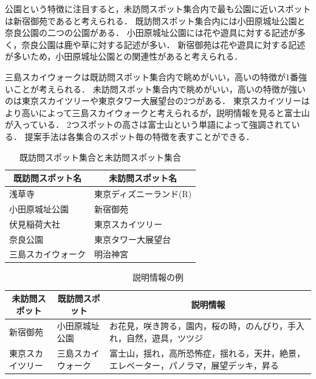 \documentclass{deimj}
\begin{document}
公園という特徴に注目すると，未訪問スポット集合内で最も公園に近いスポットは新宿御苑であると考えられる．
既訪問スポット集合内には小田原城址公園と奈良公園の二つの公園がある．
小田原城址公園には花や遊具に対する記述が多く，奈良公園は鹿や草に対する記述が多い．
新宿御苑は花や遊具に対する記述が多いため，小田原城址公園との関連性があると考えられる．


三島スカイウォークは既訪問スポット集合内で眺めがいい，高いの特徴が1番強いことが考えられる．
未訪問スポット集合内で眺めがいい，高いの特徴が強いのは東京スカイツリーや東京タワー大展望台の2つがある．
東京スカイツリーはより高いによって三島スカイウォークと考えられるが，説明情報を見ると富士山が入っている．
2つスポットの高さは富士山という単語によって強調されている．
提案手法は各集合のスポット毎の特徴を表すことができる．

\begin{table}[t]
  \caption{既訪問スポット集合と未訪問スポット集合}
  \label{table:既訪問スポット集合と未訪問スポット集合}
  \centering
  \begin{tabular}{l|l}
  \hline
  \multicolumn{1}{c|}{既訪問スポット名} & \multicolumn{1}{c}{未訪問スポット名} \\ \hline
  浅草寺                           & 東京ディズニーランド(R)                \\
  小田原城址公園                       & 新宿御苑                         \\
  伏見稲荷大社                        & 東京スカイツリー                     \\
  奈良公園                          & 東京タワー大展望台                    \\
  三島スカイウォーク                     & 明治神宮                         \\ \hline
  \end{tabular}
\end{table}


\begin{table}[t]
  \caption{説明情報の例}
  \label{table:説明情報の例}
  \centering
  \begin{tabular}{l|l|l}
  \hline
  \multicolumn{1}{c|}{未訪問スポット} & \multicolumn{1}{c|}{既訪問スポット} & \multicolumn{1}{c}{説明情報}                     \\ \hline
  新宿御苑                      & 小田原城址公園                         & お花見，咲き誇る，園内，桜の時，のんびり，手入れ，自然，遊具，ツツジ          \\ \hline
  東京スカイツリー                     & 三島スカイウォーク                    & 富士山，揺れ，高所恐怖症，揺れる，天井，絶景，エレベーター，パノラマ，展望デッキ，昇る \\ \hline
  \end{tabular}
\end{table}
\end{document}
